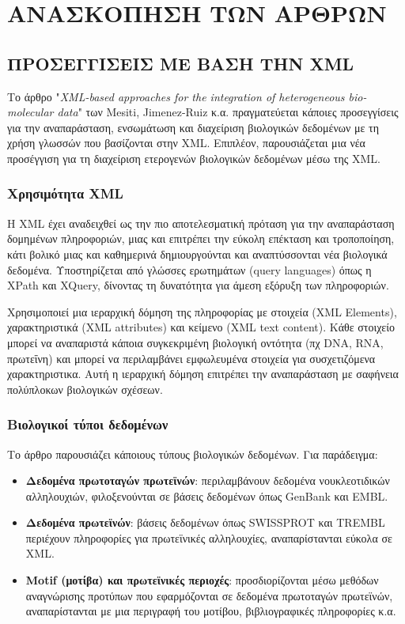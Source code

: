 \chapter{ΑΝΑΣΚΟΠΗΣΗ ΤΩΝ ΑΡΘΡΩΝ}

\section{ΠΡΟΣΕΓΓΙΣΕΙΣ ΜΕ ΒΑΣΗ ΤΗΝ XML}
    Το άρθρο "\textit{XML-based approaches for the integration of heterogeneous bio-molecular data}" των Mesiti, Jimenez-Ruiz κ.α. πραγματεύεται κάποιες προσεγγίσεις για την αναπαράσταση, ενσωμάτωση και διαχείριση βιολογικών δεδομένων με τη χρήση γλωσσών που βασίζονται στην XML.
    Επιπλέον, παρουσιάζεται μια νέα προσέγγιση για τη διαχείριση ετερογενών βιολογικών δεδομένων μέσω της XML. \cite{XMLbasedApproaches}
    
    \subsection{Χρησιμότητα XML}
        Η XML έχει αναδειχθεί ως την πιο αποτελεσματική πρόταση για την αναπαράσταση δομημένων πληροφοριών, μιας και επιτρέπει την εύκολη επέκταση και τροποποίηση, κάτι βολικό μιας και καθημερινά δημιουργούνται και αναπτύσσονται νέα βιολογικά δεδομένα.
        Υποστηρίζεται από γλώσσες ερωτημάτων (query languages) όπως η XPath και XQuery, δίνοντας τη δυνατότητα για άμεση εξόρυξη των πληροφοριών.

        Χρησιμοποιεί μια ιεραρχική δόμηση της πληροφορίας με στοιχεία (XML Elements), χαρακτηριστικά (XML attributes) και κείμενο (XML text content).
        Κάθε στοιχείο μπορεί να αναπαριστά κάποια συγκεκριμένη βιολογική οντότητα (πχ DNA, RNA, πρωτεΐνη) και μπορεί να περιλαμβάνει εμφωλευμένα στοιχεία για συσχετιζόμενα χαρακτηριστικα.
        Αυτή η ιεραρχική δόμηση επιτρέπει την αναπαράσταση με σαφήνεια πολύπλοκων βιολογικών σχέσεων.


    \subsection{Βιολογικοί τύποι δεδομένων}
        Το άρθρο παρουσιάζει κάποιους τύπους βιολογικών δεδομένων. Για παράδειγμα:
    \begin{itemize}[label={\tiny \blacksquare}]
        \vspace{-10pt}
        \item \textbf{Δεδομένα πρωτοταγών πρωτεϊνών}: περιλαμβάνουν δεδομένα νουκλεοτιδικών αλληλουχιών, φιλοξενούνται σε βάσεις δεδομένων όπως GenBank και EMBL.
        \item \textbf{Δεδομένα πρωτεϊνών}: βάσεις δεδομένων όπως SWISSPROT και TREMBL περιέχουν πληροφορίες για πρωτεϊνικές αλληλουχίες, αναπαρίστανται εύκολα σε XML.
        \item \textbf{Motif (μοτίβα) και πρωτεϊνικές περιοχές}: προσδιορίζονται μέσω μεθόδων αναγνώρισης προτύπων που εφαρμόζονται σε δεδομένα πρωτοταγών πρωτεϊνών, αναπαρίστανται με μια περιγραφή του μοτίβου, βιβλιογραφικές πληροφορίες κ.α.
    \end{itemize}


